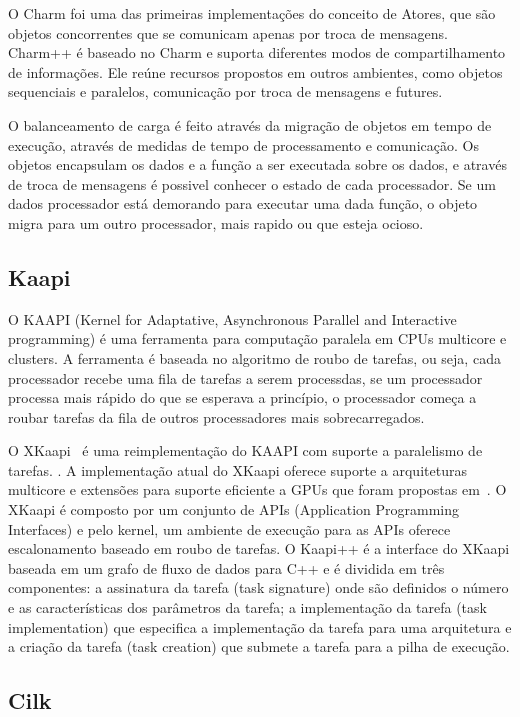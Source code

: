 O Charm foi uma das primeiras implementações do conceito de Atores, que são objetos concorrentes que se comunicam apenas por troca de mensagens. Charm++ é baseado no Charm e suporta diferentes modos de compartilhamento de informações. Ele reúne recursos propostos em outros ambientes, como objetos sequenciais e paralelos, comunicação por troca de mensagens e futures. 

O balanceamento de carga é feito através da migração de objetos em tempo de execução, através de medidas de tempo de processamento e comunicação. Os objetos encapsulam os dados e a função a ser executada sobre os dados, e através de troca de mensagens é possivel conhecer o estado de cada processador. Se um dados processador está demorando para executar uma dada função, o objeto migra para um outro processador, mais rapido ou que esteja ocioso. 

\subsection{Kaapi}

O KAAPI (Kernel for Adaptative, Asynchronous Parallel and Interactive programming) é uma ferramenta para computação paralela em CPUs multicore e clusters. A ferramenta é baseada no algoritmo de roubo de tarefas, ou seja, cada processador recebe uma fila de tarefas a serem processdas, se um processador processa mais rápido do que se esperava a princípio, o processador começa a roubar tarefas da fila de outros processadores mais sobrecarregados.

O XKaapi~\citep{gautier:hal-00799904} é uma reimplementação do KAAPI com suporte a paralelismo de tarefas. . A implementação atual do XKaapi oferece suporte a arquiteturas multicore e extensões para suporte eficiente a GPUs que foram propostas em~\citep{hermann:inria-00502448, lima2012exploiting}. O XKaapi é composto por um conjunto de APIs (Application Programming Interfaces) e pelo kernel, um ambiente de execução para as APIs oferece escalonamento baseado em roubo de tarefas. O Kaapi++ é a interface do XKaapi baseada em um grafo de fluxo de dados para C++ e é dividida em três componentes: a assinatura da tarefa (task signature) onde são definidos o número e as características dos parâmetros da tarefa; a implementação da tarefa (task implementation) que especifica a implementação da tarefa para uma arquitetura e a criação da tarefa (task creation) que submete a tarefa para a pilha de execução.

\subsection{Cilk}

